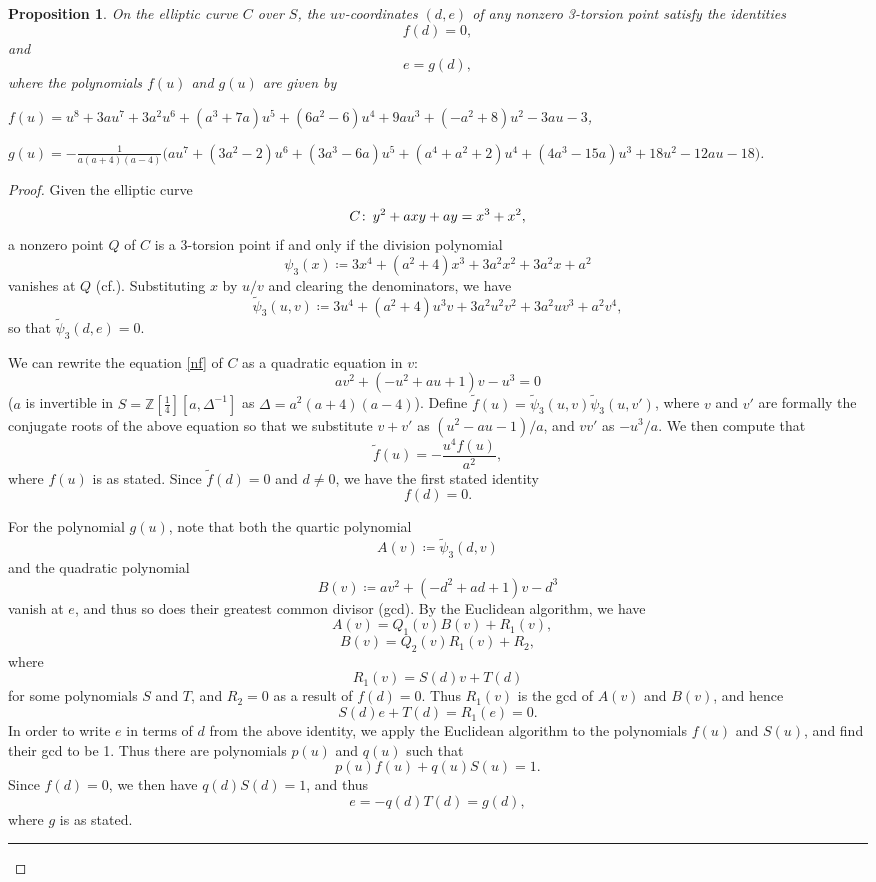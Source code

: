 \documentclass{gtpart}
\newtheorem{prop}[thm]{Proposition}
\theoremstyle{definition}
\theoremstyle{remark}
\def\co{\colon\thinspace}
\newcommand{\mb}[1]{\mathbb{#1}}
\newcommand{\cff}[2]{cf.\thinspace{\cite[#1]{#2}}}
\newcommand{\BZ}{{\mb Z}}
\newcommand{\Tf}{\widetilde{f}}
\newcommand{\TP}{\widetilde{\psi}}
\begin{document}
\begin{prop}
\label{prop:tors}
 On the elliptic curve $C$ over $S$, the $uv$-coordinates $(d,e)$ of any nonzero 3-torsion point satisfy the identities 
 \[
  f(d) = 0, 
 \]
 and 
 \[
  e = g(d), 
 \]
 where the polynomials $f(u)$ and $g(u)$ are given by 

 $f(u) = u^8 + 3 a u^7 + 3 a^2 u^6 + (a^3 + 7 a) u^5 + (6 a^2 - 6) u^4 + 9 a u^3 + (-a^2 + 8) u^2 - 3 a u - 3$, 

 $g(u) = -\frac{1}{a (a + 4) (a - 4)} \big(a u^7 + (3 a^2 - 2) u^6 + (3 a^3 - 6 a) u^5 + (a^4 + a^2 + 2) u^4 + (4 a^3 - 15 a) u^3 + 18 u^2 - 12 a u - 18\big)$.  
\end{prop}
\begin{proof}
 Given the elliptic curve 
 \[
  C \co y^2 + a x y + a y = x^3 + x^2, 
 \]
 a nonzero point $Q$ of $C$ is a 3-torsion point if and only if the division polynomial 
 \[
  \psi_3 (x) \coloneqq 3x^4 + (a^2 + 4) x^3 + 3a^2 x^2 + 3a^2 x + a^2 
 \]
 vanishes at $Q$ (\cff{Exercise 3.7f}{AEC}).  Substituting $x$ by $u/v$ and clearing the denominators, we have 
 \[
  \TP_3(u,v) \coloneqq 3u^4 + (a^2 + 4) u^3 v + 3a^2 u^2 v^2 + 3a^2 u v^3 + a^2 v^4, 
 \]
 so that $\TP_3(d,e) = 0$.  

 We can rewrite the equation \eqref{nf} of $C$ as a quadratic equation in $v$: 
 \[
  a v^2 + (-u^2 + a u + 1) v - u^3 = 0 
 \]
 ($a$ is invertible in $S = \BZ [\frac{1}{4}] [a, \Delta^{-1}]$ as $\Delta = a^2 (a + 4) (a - 4)$).  
 Define $\Tf(u) = \TP_3(u,v) \TP_3(u,v')$, where $v$ and $v'$ are formally the conjugate roots of the 
 above equation so that we substitute $v + v'$ as $(u^2 - a u - 1) / a$, and $v v'$ as $-u^3 / a$.  We then compute that 
 \[
  \Tf(u) = -\frac{u^4 f(u)}{a^2}, 
 \]
 where $f(u)$ is as stated.  
 Since $\Tf(d) = 0$ and $d \neq 0$, we have the first stated identity 
 \[
  f(d) = 0.  
 \]

 For the polynomial $g(u)$, note that both the quartic polynomial 
 \[
  A(v) \coloneqq \TP_3(d,v) 
 \]
 and the quadratic polynomial 
 \[
  B(v) \coloneqq a v^2 + (-d^2 + a d + 1) v - d^3
 \]
 vanish at $e$, and thus so does their greatest common divisor (gcd).  By the Euclidean algorithm, we have 
 \[
  ~~~A(v) = Q_1(v) B(v) + R_1(v), 
 \]
 \[
  B(v) = Q_2(v) R_1(v) + R_2, 
 \]
 where 
 \[
  R_1(v) = S(d) v + T(d)
 \]
 for some polynomials $S$ and $T$, and $R_2 = 0$ as a result of $f(d) = 0$.  Thus $R_1(v)$ is the gcd of $A(v)$ and $B(v)$, and hence 
 \[
  S(d) e + T(d) = R_1(e) = 0.  
 \]
 In order to write $e$ in terms of $d$ from the above identity, we apply the Euclidean algorithm to the polynomials $f(u)$ and $S(u)$, and find their gcd to be 1.  
 Thus there are polynomials $p(u)$ and $q(u)$ such that 
 \[
  p(u) f(u) + q(u) S(u) = 1.  
 \]
 Since $f(d) = 0$, we then have $q(d) S(d) = 1$, and thus 
 \[
  e = -q(d) T(d) = g(d), 
 \]
 where $g$ is as stated.  
\\
\hrule


\end{proof}
\end{document}
